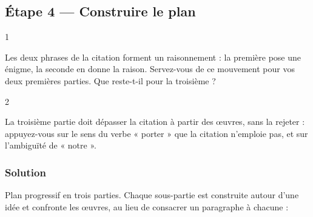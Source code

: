 \documentclass[11pt,a4paper]{article}
\begin{document}
\hypertarget{uxe9tape-4-construire-le-plan}{%
\subsection{Étape 4 --- Construire le plan}\label{uxe9tape-4-construire-le-plan}}

\begin{indication}{1}

Les deux phrases de la citation forment un raisonnement : la première pose une énigme, la seconde en donne la raison. Servez-vous de ce mouvement pour vos deux premières parties. Que reste-t-il pour la troisième ?

\end{indication}

\begin{indication}{2}

La troisième partie doit dépasser la citation à partir des œuvres, sans la rejeter : appuyez-vous sur le sens du verbe « porter » que la citation n'emploie pas, et sur l'ambiguïté de « notre ».

\end{indication}

\hypertarget{solution-3}{%
\subsubsection{Solution}\label{solution-3}}

Plan progressif en trois parties. Chaque sous-partie est construite autour d'une idée et confronte les œuvres, au lieu de consacrer un paragraphe à chacune :
\end{document}
